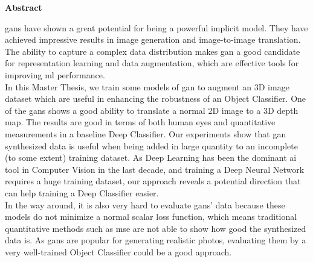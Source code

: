 \thispagestyle{empty}
\vspace*{1.0cm}

\begin{center}
    \textbf{Abstract}
\end{center}

\vspace*{0.5cm}

\noindent

\acrfull{gan}s have shown a great potential for being a powerful implicit model. They have
achieved impressive results in image generation and image-to-image translation. The
ability to capture a complex data distribution makes \acrshort{gan} a good candidate for
representation learning and data augmentation, which are effective tools for improving
\acrlong{ml} performance.
\\

In this Master Thesis, we train some models of \acrfull{gan} to augment an 3D image
dataset which are useful in enhancing the robustness of an Object Classifier. One of the
\acrshort{gan}s shows a good ability to translate a normal 2D image to a 3D depth map. The
results are good in terms of both human eyes and quantitative measurements in a baseline
Deep Classifier. Our experiments show that \acrshort{gan} synthesized data is useful when
being added in large quantity to an incomplete (to some extent) training dataset. As Deep
Learning has been the dominant \acrfull{ai} tool in Computer Vision in the last decade,
and training a Deep Neural Network requires a huge training dataset, our approach reveals
a potential direction that can help training a Deep Classifier easier.
\\

In the way around, it is also very hard to evaluate \acrshort{gan}s' data because these
models do not minimize a normal scalar loss function, which means traditional quantitative
methods such as \acrfull{mse} are not able to show how good the synthesized data is. As
\acrshort{gan}s are popular for generating realistic photos, evaluating them by a very
well-trained Object Classifier could be a good approach.
